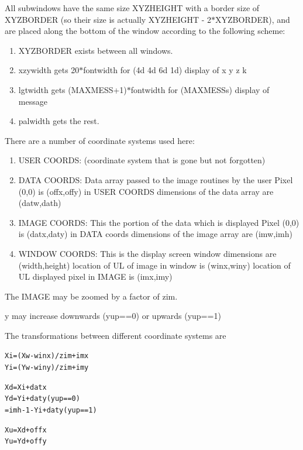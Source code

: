 All subwindows have the same size XYZHEIGHT with a border size of XYZBORDER (so their size is actually XYZHEIGHT - 2$\ast$XYZBORDER), and are placed along the bottom of the window according to the following scheme: \begin{enumerate}
\item XYZBORDER exists between all windows. \item xzywidth gets 20$\ast$fontwidth for (4d 4d 6d 1d) display of x y z k \item lgtwidth gets (MAXMESS+1)$\ast$fontwidth for (MAXMESSs) display of message \item palwidth gets the rest. \end{enumerate}


There are a number of coordinate systems used here: \begin{enumerate}
\item USER COORDS: (coordinate system that is gone but not forgotten)

\item DATA COORDS: Data array passed to the image routines by the user Pixel (0,0) is (offx,offy) in USER COORDS dimensions of the data array are (datw,dath)

\item IMAGE COORDS: This the portion of the data which is displayed Pixel (0,0) is (datx,daty) in DATA coords dimensions of the image array are (imw,imh)

\item WINDOW COORDS: This is the display screen window dimensions are (width,height) location of UL of image in window is (winx,winy) location of UL displayed pixel in IMAGE is (imx,imy) \end{enumerate}


The IMAGE may be zoomed by a factor of zim.

y may increase downwards (yup==0) or upwards (yup==1)

The transformations between different coordinate systems are \small\begin{alltt}
   Xi = (Xw - winx) / zim + imx         
   Yi = (Yw - winy) / zim + imy\end{alltt}\normalsize 


\small\begin{alltt}   Xd = Xi + datx                       
   Yd = Yi + daty                 (yup==0)
      = imh-1 - Yi +daty          (yup==1)\end{alltt}\normalsize 


\small\begin{alltt}   Xu = Xd + offx 
   Yu = Yd + offy
   \end{alltt}\normalsize 


